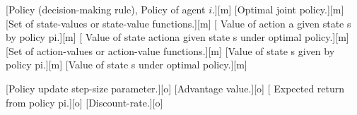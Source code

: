 \newcommand*{\Mgroupname}{Machine Learning}
[Policy (decision-making rule), Policy of agent \(i\).][m]
[Optimal joint policy.][m]
[Set of state-values or state-value functions.][m]
[
    Value of action \gls{a} given state \gls{s} by policy \gls{pi}.][m]
[
    Value of state action\gls{a} given state \gls{s} under optimal policy.][m]
[Set of action-values or action-value functions.][m]
[Value of state \gls{s} given by policy \gls{pi}.][m]
[Value of state \gls{s} under optimal policy.][m]


\newcommand*{\Ogroupname}{Optimization}
[Policy update step-size parameter.][o]
[Advantage value.][o]
[
    Expected return from policy \gls{pi}.][o]
[Discount-rate.][o]


\newcommand{\Hom}[1]{\widetilde{#1}}    %
